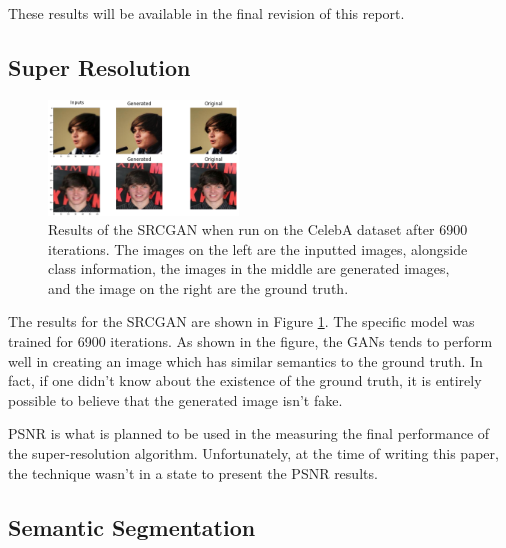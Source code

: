 These results will be available in the final revision of this report.

\subsection{Super Resolution}

\begin{figure}
	\centering
	\includegraphics[width=0.45\textwidth]{images/gan-res.png}
	\caption{Results of the SRCGAN when run on the CelebA dataset after 6900
	iterations. The images on the left are the inputted images, alongside class
	information, the images in the middle are generated images, and the image on
	the right are the ground truth.}
	\label{fig:gan-res}
\end{figure}

The results for the SRCGAN are shown in Figure \ref{fig:gan-res}. The specific model was
trained for 6900 iterations. As shown in the figure, the GANs tends to perform
well in creating an image which has similar semantics to the ground truth. In
fact, if one didn't know about the existence of the ground truth, it is entirely
possible to believe that the generated image isn’t fake.

PSNR is what is planned to be used in the measuring the final performance of the
super-resolution algorithm. Unfortunately, at the time of writing this paper,
the technique wasn’t in a state to present the PSNR results. 

\subsection{Semantic Segmentation}


